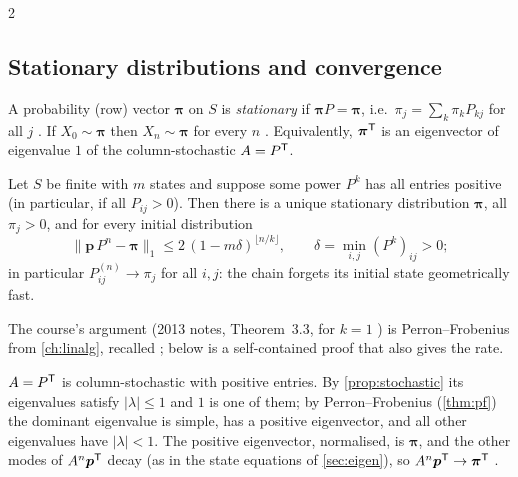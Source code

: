 \begin{paracol}{2}
\subsection{Stationary distributions and convergence}
\begin{definition}
A probability (row) vector $\bm\pi$ on $S$ is \emph{stationary} if $\bm\pi P=\bm\pi$, i.e.\
$\pi_j=\sum_k\pi_kP_{kj}$ for all $j$ . If $X_0\sim\bm\pi$ then $X_n\sim\bm\pi$ for every
$n$ \ts{13}{5}{54:52}. Equivalently, $\bm\pi^{\mathsf T}$ is an eigenvector of eigenvalue $1$ of the column-stochastic
$A=P^{\mathsf T}$.
\end{definition}

\begin{theorem}\label{ch04:thm-conv}
Let $S$ be finite with $m$ states and suppose some power $P^k$ has all entries positive (in particular, if
all $P_{ij}>0$). Then there is a unique stationary distribution $\bm\pi$, all $\pi_j>0$, and for every
initial distribution
\[
  \bigl\|\bm p\,P^n-\bm\pi\bigr\|_1\le 2\,(1-m\delta)^{\lfloor n/k\rfloor},\qquad
  \delta=\min_{i,j}(P^k)_{ij}>0 ;
\]
in particular $P^{(n)}_{ij}\to\pi_j$ for all $i,j$: the chain forgets its initial state geometrically fast.
\end{theorem}

The course's argument (2013 notes, Theorem~3.3, for $k=1$ ) is Perron--Frobenius from
\cref{ch:linalg}, recalled \inmargin{}; below is a self-contained proof that also gives the rate.
\begin{recall}
$A=P^{\mathsf T}$ is column-stochastic with positive entries. By \cref{prop:stochastic}
its eigenvalues satisfy $|\lambda|\le1$ and $1$ is one of them; by
Perron--Frobenius (\cref{thm:pf}) the dominant eigenvalue is simple, has a
positive eigenvector, and all other eigenvalues have $|\lambda|<1$. The positive
eigenvector, normalised, is $\bm\pi$, and the other modes of $A^n\bm p^{\mathsf T}$
decay (as in the state equations of \cref{sec:eigen}), so
$A^n\bm p^{\mathsf T}\to\bm\pi^{\mathsf T}$ .
\end{recall}


\end{paracol}
